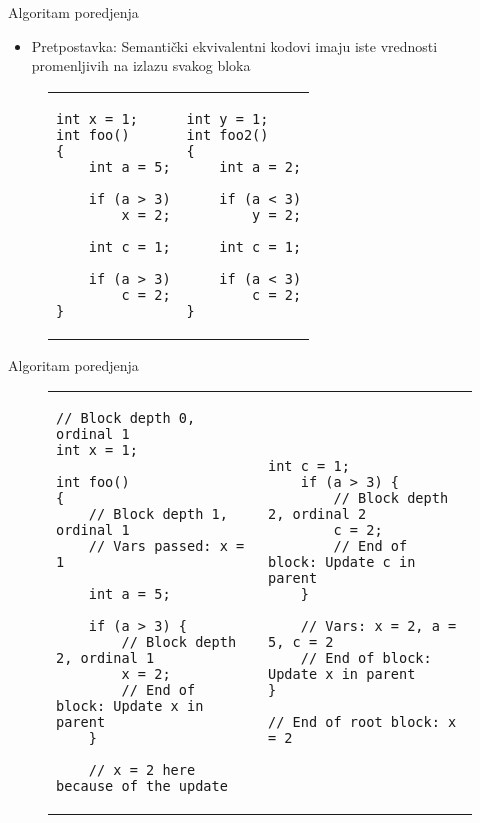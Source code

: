 \begin{frame}[fragile]{Algoritam poredjenja}
    \begin{itemize}
        \item Pretpostavka: Semanti\v{c}ki ekvivalentni kodovi imaju iste vrednosti promenljivih na izlazu svakog bloka
    \end{itemize}
\begin{figure}[!h]
\centering
\begin{tabular}{ p{4.5cm} p{4.5cm} }
\begin{lstlisting}
int x = 1;
int foo()
{
    int a = 5;

    if (a > 3)
        x = 2;

    int c = 1;

    if (a > 3)
        c = 2;
}
\end{lstlisting}
&
\begin{lstlisting}
int y = 1;
int foo2()
{
    int a = 2;

    if (a < 3)
        y = 2;

    int c = 1;

    if (a < 3)
        c = 2;
}
\end{lstlisting}
\end{tabular}
\end{figure}
\end{frame}


\begin{frame}[fragile]{Algoritam poredjenja}
\begin{figure}[!h]
\centering
\begin{tabular}{ p{4.5cm} p{4.5cm} }
\begin{lstlisting}[basicstyle=\tiny\ttfamily]
// Block depth 0, ordinal 1
int x = 1;

int foo()
{
    // Block depth 1, ordinal 1
    // Vars passed: x = 1

    int a = 5;

    if (a > 3) {
        // Block depth 2, ordinal 1
        x = 2;
        // End of block: Update x in parent
    }

    // x = 2 here because of the update
\end{lstlisting}
&
\begin{lstlisting}[basicstyle=\tiny\ttfamily]
    int c = 1;
    if (a > 3) {
        // Block depth 2, ordinal 2
        c = 2;
        // End of block: Update c in parent
    }

    // Vars: x = 2, a = 5, c = 2
    // End of block: Update x in parent
}

// End of root block: x = 2
\end{lstlisting}
\end{tabular}
\end{figure}
\end{frame}


